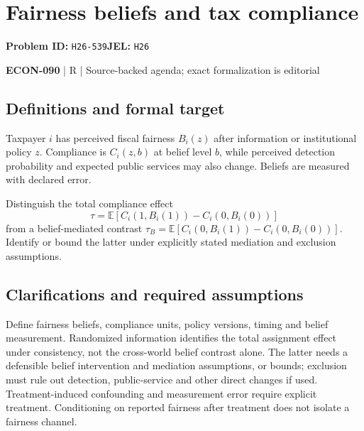 \documentclass[11pt,a4paper]{article}
\begin{document}
\section*{Fairness beliefs and tax compliance}
\textbf{Problem ID:} \texttt{H26-539}\quad \textbf{JEL:} \texttt{H26}\par
\label{problem:OP-0649}


\label{audited:ECON-090}

{\sffamily\small\color{muted}\textbf{ECON-090} | R | Source-backed agenda; exact formalization is editorial\par}

\subsection*{Definitions and formal target}

Taxpayer $i$ has perceived fiscal fairness $B_i(z)$ after information or institutional policy $z$. Compliance is $C_i(z,b)$ at belief level $b$, while perceived detection probability and expected public services may also change. Beliefs are measured with declared error.

Distinguish the total compliance effect
\[
 \tau=\mathbb E[C_i(1,B_i(1))-C_i(0,B_i(0))]
\]
from a belief-mediated contrast $\tau_B=\mathbb E[C_i(0,B_i(1))-C_i(0,B_i(0))]$. Identify or bound the latter under explicitly stated mediation and exclusion assumptions.

\subsection*{Clarifications and required assumptions}

Define fairness beliefs, compliance units, policy versions, timing and belief measurement. Randomized information identifies the total assignment effect under consistency, not the cross-world belief contrast alone. The latter needs a defensible belief intervention and mediation assumptions, or bounds; exclusion must rule out detection, public-service and other direct changes if used. Treatment-induced confounding and measurement error require explicit treatment. Conditioning on reported fairness after treatment does not isolate a fairness channel.
\end{document}
